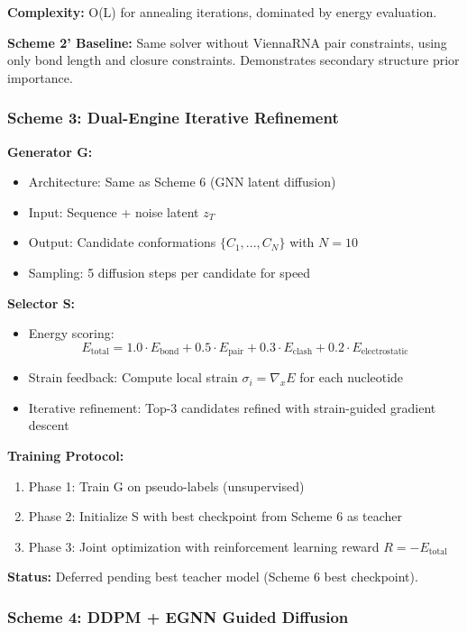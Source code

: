 \documentclass[12pt]{article}
\begin{document}
\textbf{Complexity:} O(L) for annealing iterations, dominated by energy evaluation.

\textbf{Scheme 2' Baseline:} Same solver without ViennaRNA pair constraints, using only bond length and closure constraints. Demonstrates secondary structure prior importance.

\subsubsection{Scheme 3: Dual-Engine Iterative Refinement}

\textbf{Generator G:}
\begin{itemize}
\item Architecture: Same as Scheme 6 (GNN latent diffusion)
\item Input: Sequence + noise latent $z_T$
\item Output: Candidate conformations $\{C_1, ..., C_N\}$ with $N=10$
\item Sampling: 5 diffusion steps per candidate for speed
\end{itemize}

\textbf{Selector S:}
\begin{itemize}
\item Energy scoring:
\begin{equation}
E_{\text{total}} = 1.0 \cdot E_{\text{bond}} + 0.5 \cdot E_{\text{pair}} + 0.3 \cdot E_{\text{clash}} + 0.2 \cdot E_{\text{electrostatic}}
\end{equation}
\item Strain feedback: Compute local strain $\sigma_i = \nabla_x E$ for each nucleotide
\item Iterative refinement: Top-3 candidates refined with strain-guided gradient descent
\end{itemize}

\textbf{Training Protocol:}
\begin{enumerate}
\item Phase 1: Train G on pseudo-labels (unsupervised)
\item Phase 2: Initialize S with best checkpoint from Scheme 6 as teacher
\item Phase 3: Joint optimization with reinforcement learning reward $R = -E_{\text{total}}$
\end{enumerate}

\textbf{Status:} Deferred pending best teacher model (Scheme 6 best checkpoint).

\subsubsection{Scheme 4: DDPM + EGNN Guided Diffusion}
\end{document}
